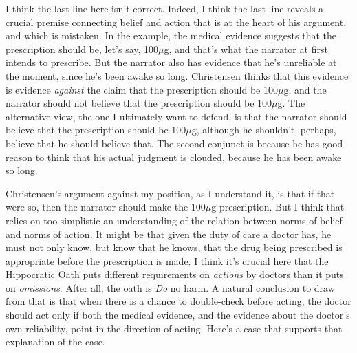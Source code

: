 I think the last line here isn't correct. Indeed, I think the last line reveals a crucial premise connecting belief and action that is at the heart of his argument, and which is mistaken. In the example, the medical evidence suggests that the prescription should be, let's say, 100$\mu$g, and that's what the narrator at first intends to prescribe. But the narrator also has evidence that he's unreliable at the moment, since he's been awake so long. Christensen thinks that this evidence is evidence \textit{against} the claim that the prescription should be 100$\mu$g, and the narrator should not believe that the prescription should be 100$\mu$g. The alternative view, the one I ultimately want to defend, is that the narrator should believe that the prescription should be 100$\mu$g, although he shouldn't, perhaps, believe that he should believe that. The second conjunct is because he has good reason to think that his actual judgment is clouded, because he has been awake so long. 

Christensen's argument against my position, as I understand it, is that if that were so, then the narrator should make the 100$\mu$g prescription. But I think that relies on too simplistic an understanding of the relation between norms of belief and norms of action. It might be that given the duty of care a doctor has, he must not only know, but know that he knows, that the drug being prescribed is appropriate before the prescription is made. I think it's crucial here that the Hippocratic Oath puts different requirements on \textit{actions} by doctors than it puts on \textit{omissions}. After all, the oath is \textit{Do} no harm. A natural conclusion to draw from that is that when there is a chance to double-check before acting, the doctor should act only if both the medical evidence, and the evidence about the doctor's own reliability, point in the direction of acting. Here's a case that supports that explanation of the case.

